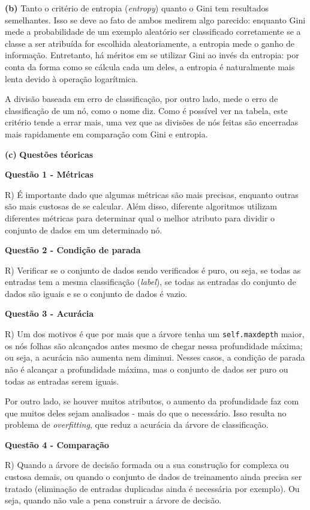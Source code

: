 \documentclass{article}
\begin{document}
\bigskip
\quad \textbf{(b)} Tanto o critério de entropia (\textit{entropy}) quanto o Gini tem resultados semelhantes. Isso se deve ao fato de ambos medirem algo parecido: enquanto Gini mede a probabilidade de um exemplo aleatório ser classificado corretamente se a classe a ser atribuída for escolhida aleatoriamente, a entropia mede o ganho de informação. Entretanto, há méritos em se utilizar Gini ao invés da entropia: por conta da forma como se cálcula cada um deles, a entropia é naturalmente mais lenta devido à operação logarítmica.

\qquad A divisão baseada em erro de classificação, por outro lado, mede o erro de classificação de um nó, como o nome diz. Como é possível ver na tabela, este critério tende a errar mais, uma vez que as divisões de nós feitas são encerradas mais rapidamente em comparação com Gini e entropia.

\bigskip
\quad \textbf{(c)}\textbf{ Questões téoricas}

\bigskip
\quad \textbf{\large{Questão 1 - Métricas}}

\qquad R) É importante dado que algumas métricas são mais precisas, enquanto outras são mais custosas de se calcular. Além disso, diferente algoritmos utilizam diferentes métricas para determinar qual o melhor atributo para dividir o conjunto de dados em um determinado nó.

\bigskip
\quad\textbf{\large{Questão 2 - Condição de parada}}

\qquad R) Verificar se o conjunto de dados sendo verificados é puro, ou seja, se todas as entradas tem a mesma classificação (\textit{label}), se todas as entradas do conjunto de dados são iguais e se o conjunto de dados é vazio.

\bigskip
\quad\textbf{\large{Questão 3 - Acurácia}}

\qquad R) Um dos motivos é que por mais que a árvore tenha um \texttt{self.maxdepth} maior, os nós folhas são alcançados antes mesmo de chegar nessa profundidade máxima; ou seja, a acurácia não aumenta nem diminui. Nesses casos, a condição de parada não é alcançar a profundidade máxima, mas o conjunto de dados ser puro ou todas as entradas serem iguais.

\qquad Por outro lado, se houver muitos atributos, o aumento da profundidade faz com que muitos deles sejam analisados - mais do que o necessário. Isso resulta no problema de \textit{overfitting}, que reduz a acurácia da árvore de classificação.

\bigskip
\quad\textbf{\large{Questão 4 - Comparação}}

\qquad R) Quando a árvore de decisão formada ou a sua construção for complexa ou custosa demais, ou quando o conjunto de dados de treinamento ainda precisa ser tratado (eliminação de entradas duplicadas ainda é necessária por exemplo). Ou seja, quando não vale a pena construir a árvore de decisão.
\end{document}
